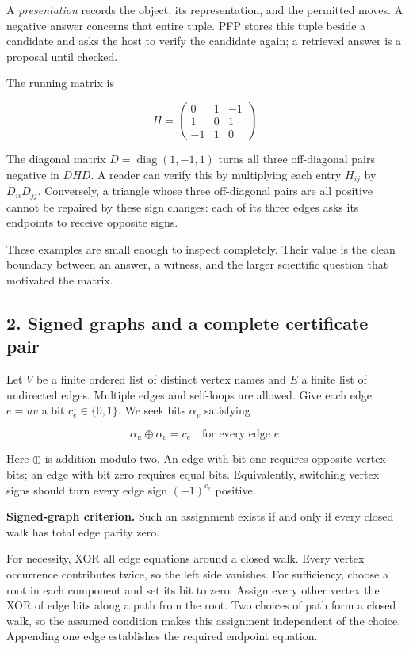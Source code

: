 \documentclass[
  11pt,
]{article}
\begin{document}
A \emph{presentation} records the object, its representation, and the
permitted moves. A negative answer concerns that entire tuple. PFP
stores this tuple beside a candidate and asks the host to verify the
candidate again; a retrieved answer is a proposal until checked.

The running matrix is

\[
H=\begin{pmatrix}0&1&-1\\1&0&1\\-1&1&0\end{pmatrix}.
\]

The diagonal matrix \(D=\operatorname{diag}(1,-1,1)\) turns all three
off-diagonal pairs negative in \(DHD\). A reader can verify this by
multiplying each entry \(H_{ij}\) by \(D_{ii}D_{jj}\). Conversely, a
triangle whose three off-diagonal pairs are all positive cannot be
repaired by these sign changes: each of its three edges asks its
endpoints to receive opposite signs.

These examples are small enough to inspect completely. Their value is
the clean boundary between an answer, a witness, and the larger
scientific question that motivated the matrix.

\subsection{2. Signed graphs and a complete certificate
pair}\label{signed-graphs-and-a-complete-certificate-pair}

Let \(V\) be a finite ordered list of distinct vertex names and \(E\) a
finite list of undirected edges. Multiple edges and self-loops are
allowed. Give each edge \(e=uv\) a bit \(c_e\in\{0,1\}\). We seek bits
\(\alpha_v\) satisfying

\[
\alpha_u\mathbin{\oplus}\alpha_v=c_e
\quad\text{for every edge }e.
\]

Here \(\oplus\) is addition modulo two. An edge with bit one requires
opposite vertex bits; an edge with bit zero requires equal bits.
Equivalently, switching vertex signs should turn every edge sign
\((-1)^{c_e}\) positive.

\textbf{Signed-graph criterion.} Such an assignment exists if and only
if every closed walk has total edge parity zero.

For necessity, XOR all edge equations around a closed walk. Every vertex
occurrence contributes twice, so the left side vanishes. For
sufficiency, choose a root in each component and set its bit to zero.
Assign every other vertex the XOR of edge bits along a path from the
root. Two choices of path form a closed walk, so the assumed condition
makes this assignment independent of the choice. Appending one edge
establishes the required endpoint equation.
\end{document}
